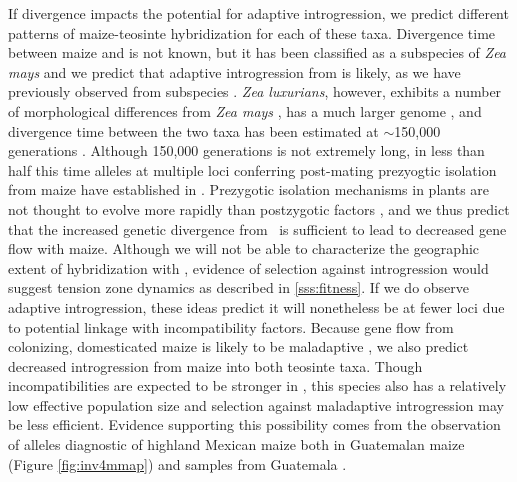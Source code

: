 If divergence impacts the potential for adaptive introgression, we predict different patterns of maize-teosinte hybridization for each of these taxa. 
Divergence time between maize and \zh{} is not known, but it has been classified as a subspecies of \emph{Zea mays} \citep{doebley1990systematics} and we predict that adaptive introgression from \zh{} is likely, as we have previously observed from subspecies \zm{} \citep{Hufford2013}.
\emph{Zea luxurians}, however, exhibits a number of morphological differences from \emph{Zea mays} \citep{doebley1980taxonomy}, has a much larger genome \citep{tenaillon2011genome}, and divergence time between the two taxa has been estimated at $\sim$150,000 generations \citep{Ross-Ibarra2009a}. 
Although 150,000 generations is not extremely long, in less than half this time alleles at multiple loci conferring post-mating prezyogtic isolation from maize have established in \zm{} \citep{evans2001teosinte,kermicle2010zea,kermicle2006gametophyte}.
Prezygotic isolation mechanisms in plants are not thought to evolve more rapidly than postzygotic factors \citep{widmer2009evolution}, and we thus predict that the increased genetic divergence from \zl\ is sufficient to lead to decreased gene flow with maize. 
Although we will not be able to characterize the geographic extent of hybridization with \zl, evidence of selection against introgression would suggest tension zone dynamics as described in \ref{sss:fitness}.
If we do observe adaptive introgression, these ideas predict it will nonetheless be at fewer loci due to potential linkage with incompatibility factors. 
Because gene flow from colonizing, domesticated maize is likely to be maladaptive \citep{Hufford2013}, we also predict decreased introgression from maize into both teosinte taxa. 
Though incompatibilities are expected to be stronger in \zl{}, this species also has a relatively low effective population size \citep{Ross-Ibarra2009a} and selection against maladaptive introgression may be less efficient.
Evidence supporting this possibility comes from the observation of alleles diagnostic of highland Mexican maize both in Guatemalan maize (Figure \ref{fig:inv4mmap}) and \zl{} samples from Guatemala \citep{Fang2012}.

